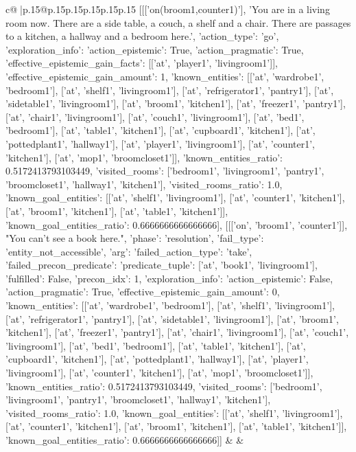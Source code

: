 \documentclass{article}
\begin{document}
{\begin{supertabular}{c@{$\;$}|p{.15\linewidth}@{}p{.15\linewidth}p{.15\linewidth}p{.15\linewidth}p{.15\linewidth}p{.15\linewidth}}
{{{	 [[['on(broom1,counter1)'], 'You are in a living room now. There are a side table, a couch, a shelf and a chair. There are passages to a kitchen, a hallway and a bedroom here.', {'action_type': 'go', 'exploration_info': {'action_epistemic': True, 'action_pragmatic': True, 'effective_epistemic_gain_facts': [['at', 'player1', 'livingroom1']], 'effective_epistemic_gain_amount': 1, 'known_entities': [['at', 'wardrobe1', 'bedroom1'], ['at', 'shelf1', 'livingroom1'], ['at', 'refrigerator1', 'pantry1'], ['at', 'sidetable1', 'livingroom1'], ['at', 'broom1', 'kitchen1'], ['at', 'freezer1', 'pantry1'], ['at', 'chair1', 'livingroom1'], ['at', 'couch1', 'livingroom1'], ['at', 'bed1', 'bedroom1'], ['at', 'table1', 'kitchen1'], ['at', 'cupboard1', 'kitchen1'], ['at', 'pottedplant1', 'hallway1'], ['at', 'player1', 'livingroom1'], ['at', 'counter1', 'kitchen1'], ['at', 'mop1', 'broomcloset1']], 'known_entities_ratio': 0.5172413793103449, 'visited_rooms': ['bedroom1', 'livingroom1', 'pantry1', 'broomcloset1', 'hallway1', 'kitchen1'], 'visited_rooms_ratio': 1.0, 'known_goal_entities': [['at', 'shelf1', 'livingroom1'], ['at', 'counter1', 'kitchen1'], ['at', 'broom1', 'kitchen1'], ['at', 'table1', 'kitchen1']], 'known_goal_entities_ratio': 0.6666666666666666}}], [[['on', 'broom1', 'counter1']], "You can't see a book here.", {'phase': 'resolution', 'fail_type': 'entity_not_accessible', 'arg': {'failed_action_type': 'take', 'failed_precon_predicate': {'predicate_tuple': ['at', 'book1', 'livingroom1'], 'fulfilled': False, 'precon_idx': 1}}, 'exploration_info': {'action_epistemic': False, 'action_pragmatic': True, 'effective_epistemic_gain_amount': 0, 'known_entities': [['at', 'wardrobe1', 'bedroom1'], ['at', 'shelf1', 'livingroom1'], ['at', 'refrigerator1', 'pantry1'], ['at', 'sidetable1', 'livingroom1'], ['at', 'broom1', 'kitchen1'], ['at', 'freezer1', 'pantry1'], ['at', 'chair1', 'livingroom1'], ['at', 'couch1', 'livingroom1'], ['at', 'bed1', 'bedroom1'], ['at', 'table1', 'kitchen1'], ['at', 'cupboard1', 'kitchen1'], ['at', 'pottedplant1', 'hallway1'], ['at', 'player1', 'livingroom1'], ['at', 'counter1', 'kitchen1'], ['at', 'mop1', 'broomcloset1']], 'known_entities_ratio': 0.5172413793103449, 'visited_rooms': ['bedroom1', 'livingroom1', 'pantry1', 'broomcloset1', 'hallway1', 'kitchen1'], 'visited_rooms_ratio': 1.0, 'known_goal_entities': [['at', 'shelf1', 'livingroom1'], ['at', 'counter1', 'kitchen1'], ['at', 'broom1', 'kitchen1'], ['at', 'table1', 'kitchen1']], 'known_goal_entities_ratio': 0.6666666666666666}}]] 
	  } 
	   } 
	   } 
	 & & \\ 
 


\end{supertabular}}
\end{document}
